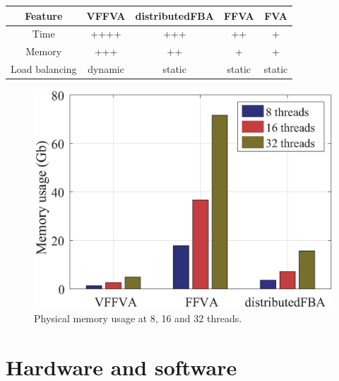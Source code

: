 \documentclass[letterpaper, 10 pt, conference]{ieeeconf}  %
\begin{document}
\begin{center}
    \begin{tabular}{ | c | c | c | c | c |}
    \hline
    Feature & VFFVA & distributedFBA & FFVA & FVA \\ \hline
    Time & ++++ & +++ & ++ & + \\ \hline
    Memory & +++ & ++ & + & + \\ \hline 
    Load balancing & dynamic & static & static & static \\ \hline 
    \end{tabular}
\end{center}

\begin{figure}[!htb]
\centering
\includegraphics[scale=.5]{figures/figure5/memoryUsage.eps}
\caption{Physical memory usage at 8, 16 and 32 threads.}
\label{fig:memory.}
\end{figure}

\section{Hardware and software}
\end{document}
